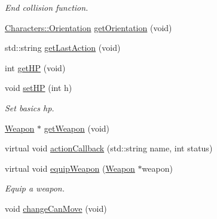 \begin{DoxyCompactItemize}
\begin{DoxyCompactList}\small\item\em End collision function. \end{DoxyCompactList}\item 
\hyperlink{class_characters_a95d5115bd36cdc1a7a21ab8c679f7524}{Characters\-::\-Orientation} \hyperlink{class_characters_a9be6daa0dc468da9c4c0ffa0d0d36ae1}{get\-Orientation} (void)
\item 
std\-::string \hyperlink{class_characters_a0df57bdee9ddc5e4e18954b8b30b1331}{get\-Last\-Action} (void)
\item 
int \hyperlink{class_characters_a136d6ba8b4bd401fda19b14b089a107f}{get\-H\-P} (void)
\item 
void \hyperlink{class_characters_a63874c1b86156aa6c4c6a7c26afef6e7}{set\-H\-P} (int h)
\begin{DoxyCompactList}\small\item\em Set basics hp. \end{DoxyCompactList}\item 
\hyperlink{class_weapon}{Weapon} $\ast$ \hyperlink{class_characters_aae885a7d773657cdf18f8dfced51d1a8}{get\-Weapon} (void)
\item 
virtual void \hyperlink{class_characters_a76e565eca6d40dc04119697e1218d24d}{action\-Callback} (std\-::string name, int status)
\item 
virtual void \hyperlink{class_characters_a99ea3219f0784f29306bfe539301b83a}{equip\-Weapon} (\hyperlink{class_weapon}{Weapon} $\ast$weapon)
\begin{DoxyCompactList}\small\item\em Equip a weapon. \end{DoxyCompactList}\item 
void \hyperlink{class_characters_a542fa5bfc689011ccc0c4cc4edc9d32a}{change\-Can\-Move} (void)
\end{DoxyCompactItemize}
